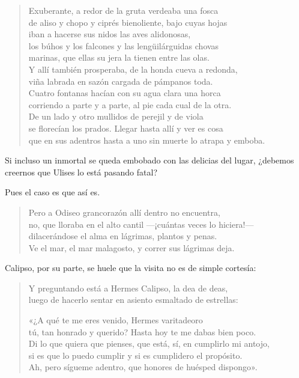\documentclass[11pt,a4paper]{article}
\begin{document}
\begin{verse}
Exuberante, a redor de la gruta verdeaba una fosca\\
de aliso y chopo y ciprés bienoliente, bajo cuyas hojas\\
iban a hacerse sus nidos las aves alidonosas,\\
los búhos y los falcones y las lengüilárguidas chovas\\
marinas, que ellas su jera la tienen entre las olas.\\
Y allí también prosperaba, de la honda cueva a redonda,\\
viña labrada en sazón cargada de pámpanos toda.\\
Cuatro fontanas hacían con su agua clara una horca\\
corriendo a parte y a parte, al pie cada cual de la otra.\\
De un lado y otro mullidos de perejil y de viola\\
se florecían los prados. Llegar hasta allí y ver es cosa\\
que en sus adentros hasta a uno sin muerte lo atrapa y emboba.
\end{verse}

Si incluso un inmortal se queda embobado con las delicias del lugar, ¿debemos creernos que Ulises lo está pasando fatal?

Pues el caso es que así es.

\begin{verse}
Pero a Odiseo grancorazón allí dentro no encuentra,\\
no, que lloraba en el alto cantil ---¡cuántas veces lo hiciera!---\\
dilacerándose el alma en lágrimas, plantos y penas.\\
Ve el mar, el mar malagosto, y correr sus lágrimas deja.
\end{verse}

Calipso, por su parte, se huele que la visita no es de simple cortesía:

\begin{verse}
Y preguntando está a Hermes Calipso, la dea de deas,\\
luego de hacerlo sentar en asiento esmaltado de estrellas:

«¿A qué te me eres venido, Hermes varitadeoro\\
tú, tan honrado y querido? Hasta hoy te me dabas bien poco.\\
Di lo que quiera que pienses, que está, sí, en cumplirlo mi antojo,\\
si es que lo puedo cumplir y si es cumplidero el propósito.\\
Ah, pero sígueme adentro, que honores de huésped dispongo».
\end{verse}
\end{document}
